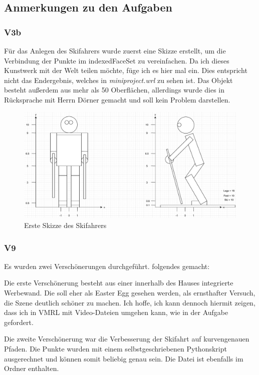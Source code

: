 \documentclass{article}
\begin{document}
\newpage

\subsection*{Anmerkungen zu den Aufgaben}
\subsubsection*{V3b}
Für das Anlegen des Skifahrers wurde zuerst eine Skizze erstellt, um die
Verbindung der Punkte im indexedFaceSet zu vereinfachen. Da ich dieses Kunstwerk
mit der Welt teilen möchte, füge ich es hier mal ein. Dies entspricht nicht das
Endergebnis, welches in \textit{miniproject.wrl} zu sehen ist. Das Objekt besteht
außerdem aus mehr als 50 Oberflächen, allerdings wurde dies in Rücksprache mit
Herrn Dörner gemacht und soll kein Problem darstellen.

\begin{figure}[h]
    \centering
    \includegraphics[scale=0.5]{skifahrer_sketch.pdf}
    \caption{Erste Skizze des Skifahrers}
\end{figure}

\subsubsection*{V9}
Es wurden zwei Verschönerungen durchgeführt. folgendes gemacht:

Die erste Verschönerung besteht aus einer innerhalb des Hauses integrierte Werbewand.
Die soll eher als Easter Egg gesehen werden, als ernsthafter Versuch, die Szene 
deutlich schöner zu machen. Ich hoffe, ich kann dennoch hiermit zeigen, dass ich
in VMRL mit Video-Dateien umgehen kann, wie in der Aufgabe gefordert.

Die zweite Verschönerung war die Verbesserung der Skifahrt auf kurvengenauen Pfaden.
Die Punkte wurden mit einem selbstgeschriebenen Pythonskript ausgerechnet und können
somit beliebig genau sein. Die Datei ist ebenfalls im Ordner enthalten.
\end{document}

